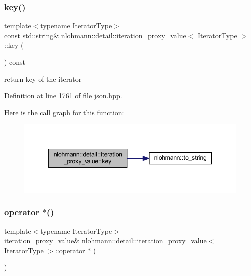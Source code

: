 \subsubsection{\texorpdfstring{key()}{key()}}
{\footnotesize\ttfamily template$<$typename Iterator\+Type$>$ \\
const \mbox{\hyperlink{namespacenlohmann_1_1detail_a1ed8fc6239da25abcaf681d30ace4985ab45cffe084dd3d20d928bee85e7b0f21}{std\+::string}}\& \mbox{\hyperlink{classnlohmann_1_1detail_1_1iteration__proxy__value}{nlohmann\+::detail\+::iteration\+\_\+proxy\+\_\+value}}$<$ Iterator\+Type $>$\+::key (\begin{DoxyParamCaption}{ }\end{DoxyParamCaption}) const\hspace{0.3cm}{\ttfamily [inline]}}



return key of the iterator 



Definition at line 1761 of file json.\+hpp.

Here is the call graph for this function\+:
\nopagebreak
\begin{figure}[H]
\begin{center}
\leavevmode
\includegraphics[width=346pt]{classnlohmann_1_1detail_1_1iteration__proxy__value_a614278e2eecdf088199fac275ce114b6_cgraph}
\end{center}
\end{figure}
\mbox{\label{classnlohmann_1_1detail_1_1iteration__proxy__value_a41384b6e643e8388e4c849b6b8f1312a}} 
\subsubsection{\texorpdfstring{operator $\ast$()}{operator *()}}
{\footnotesize\ttfamily template$<$typename Iterator\+Type$>$ \\
\mbox{\hyperlink{classnlohmann_1_1detail_1_1iteration__proxy__value}{iteration\+\_\+proxy\+\_\+value}}\& \mbox{\hyperlink{classnlohmann_1_1detail_1_1iteration__proxy__value}{nlohmann\+::detail\+::iteration\+\_\+proxy\+\_\+value}}$<$ Iterator\+Type $>$\+::operator $\ast$ (\begin{DoxyParamCaption}{ }\end{DoxyParamCaption})\hspace{0.3cm}{\ttfamily [inline]}}



